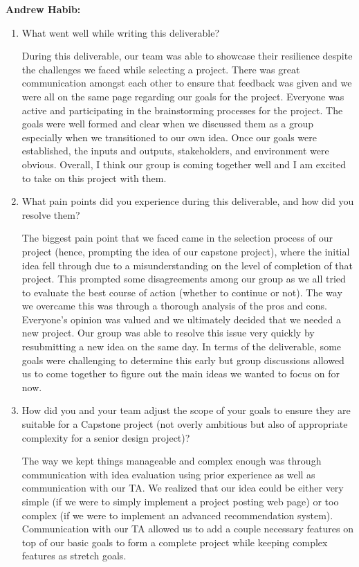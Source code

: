 \documentclass{article}
\begin{document}
\textbf{Andrew Habib:}

\begin{enumerate}

    \item What went well while writing this deliverable?

          During this deliverable, our team was able to showcase their
          resilience despite the challenges we faced while selecting a project.
          There was great communication amongst each other to ensure that
          feedback was given and we were all on the same page regarding our
          goals for the project. Everyone was active and participating in the
          brainstorming processes for the project. The goals were well formed
          and clear when we discussed them as a group especially when we
          transitioned to our own idea. Once our goals were established, the
          inputs and outputs, stakeholders, and environment were obvious.
          Overall, I think our group is coming together well and I am excited
          to take on this project with them.

    \item What pain points did you experience during this deliverable, and how
          did you resolve them?

          The biggest pain point that we faced came in the selection process of
          our project (hence, prompting the idea of our capstone project),
          where the initial idea fell through due to a misunderstanding on the
          level of completion of that project. This prompted some disagreements
          among our group as we all tried to evaluate the best course of action
          (whether to continue or not). The way we overcame this was through a
          thorough analysis of the pros and cons. Everyone's opinion was valued
          and we ultimately decided that we needed a new project. Our group was
          able to resolve this issue very quickly by resubmitting a new idea on
          the same day. In terms of the deliverable, some goals were
          challenging to determine this early but group discussions allowed us
          to come together to figure out the main ideas we wanted to focus on
          for now.

    \item How did you and your team adjust the scope of your goals to ensure
          they are suitable for a Capstone project (not overly ambitious but
          also of appropriate complexity for a senior design project)?

          The way we kept things manageable and complex enough was through
          communication with idea evaluation using prior experience as well as
          communication with our TA. We realized that our idea could be either
          very simple (if we were to simply implement a project posting web
          page) or too complex (if we were to implement an advanced
          recommendation system). Communication with our TA allowed us to add a
          couple necessary features on top of our basic goals to form a
          complete project while keeping complex features as stretch goals.

\end{enumerate}
\end{document}
